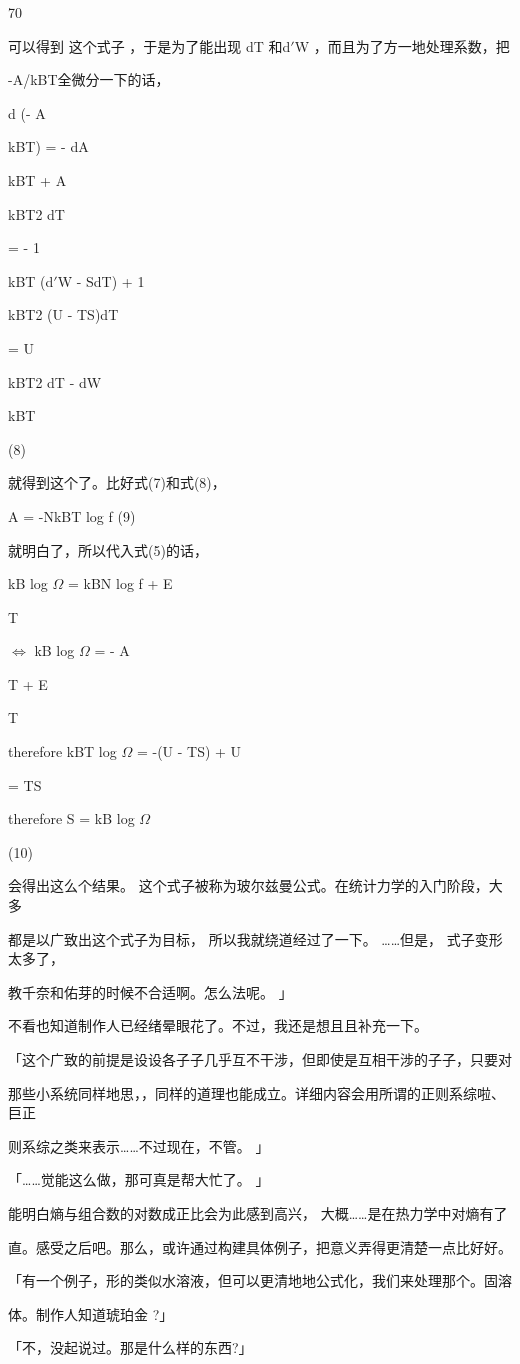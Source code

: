 70\par
可以得到 这个式子 ，于是为了能出现 dT 和d$\prime$W ，而且为了方一地处理系数，把\par
-A/kBT全微分一下的话，\par
d (- A\par
kBT) = - dA\par
kBT + A\par
kBT2 dT\par
= - 1\par
kBT (d$\prime$W - SdT) + 1\par
kBT2 (U - TS)dT\par
= U\par
kBT2 dT - dW\par
kBT\par
(8)\par
就得到这个了。比好式(7)和式(8)，\par
A = -NkBT log f (9)\par
就明白了，所以代入式(5)的话，\par
kB log $\Omega$ = kBN log f + E\par
T\par
$\Leftrightarrow$ kB log $\Omega$ = - A\par
T + E\par
T\par
therefore kBT log $\Omega$ = -(U - TS) + U\par
= TS\par
therefore S = kB log $\Omega$\par
(10)\par
会得出这么个结果。 这个式子被称为玻尔兹曼公式。在统计力学的入门阶段，大多\par
都是以广致出这个式子为目标， 所以我就绕道经过了一下。 ……但是， 式子变形太多了，\par
教千奈和佑芽的时候不合适啊。怎么法呢。 」\par
不看也知道制作人已经绪晕眼花了。不过，我还是想且且补充一下。\par
「这个广致的前提是设设各子子几乎互不干涉，但即使是互相干涉的子子，只要对\par
那些小系统同样地思，，同样的道理也能成立。详细内容会用所谓的正则系综啦、 巨正\par
则系综之类来表示……不过现在，不管。 」\par
「……觉能这么做，那可真是帮大忙了。 」\par
能明白熵与组合数的对数成正比会为此感到高兴， 大概……是在热力学中对熵有了\par
直。感受之后吧。那么，或许通过构建具体例子，把意义弄得更清楚一点比好好。\par
「有一个例子，形的类似水溶液，但可以更清地地公式化，我们来处理那个。固溶\par
体。制作人知道琥珀金 ?」\par
「不，没起说过。那是什么样的东西?」\par

